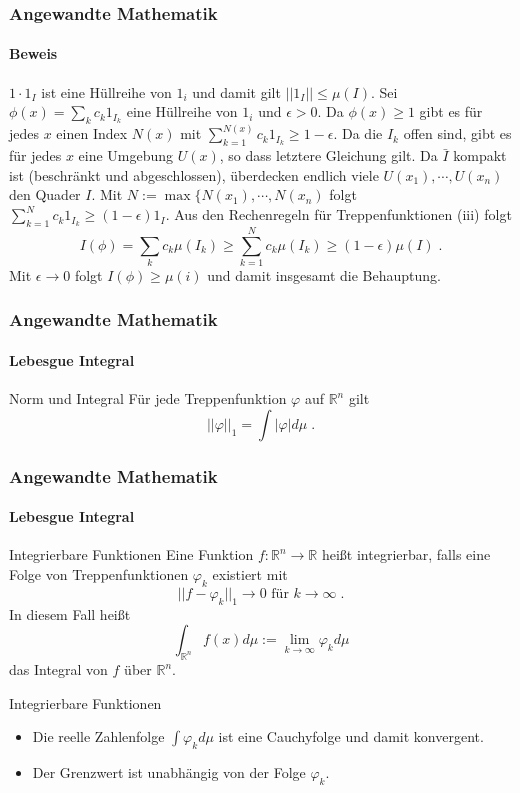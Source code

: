 \documentclass{beamer}
\begin{document}
\begin{frame}
    \frametitle{Angewandte Mathematik}
\framesubtitle{Beweis}
$ 1 \cdot 1_I$ ist eine Hüllreihe von $1_i$ und damit gilt $|| 1_I || \leq \mu(I)$. 
Sei $\phi(x) = \sum_k c_k 1_{I_k} $ eine Hüllreihe von $1_i$ und $\epsilon >0$. Da $\phi(x) \geq 1$ gibt es für jedes $x$ einen Index $N(x)$ mit 
$\sum_{k=1}^{N(x)} c_k 1_{I_k} \geq 1 - \epsilon$. Da die $I_k$ offen sind, gibt es für jedes $x$ eine Umgebung $U(x)$, so dass letztere Gleichung gilt. Da $\bar{I}$ kompakt ist (beschränkt und abgeschlossen), überdecken endlich viele $U(x_1), \cdots , U(x_n)$ den Quader $I$. Mit $N:= \max \{ N(x_1), \cdots , N(x_n)$ folgt $\sum_{k=1}^N c_k 1_{I_k} \geq (1-\epsilon) 1_I$. Aus den Rechenregeln für Treppenfunktionen (iii) folgt
$$ I (\phi) = \sum_k c_k \mu(I_k) \geq \sum_{k=1}^N c_k \mu (I_k) \geq (1 - \epsilon) \mu(I) \;.$$
Mit $\epsilon \to 0$ folgt $I (\phi) \geq \mu(i)$ und damit insgesamt die Behauptung.  
 \end{frame}


\begin{frame}
    \frametitle{Angewandte Mathematik}
\framesubtitle{Lebesgue Integral}
    \begin{block}{Norm und Integral}
Für jede Treppenfunktion $\varphi$ auf $\mathbb{R}^n$ gilt
$$ || \varphi ||_1 = \int | \varphi | d \mu  \; .$$
\end{block}

 \end{frame}




\begin{frame}
    \frametitle{Angewandte Mathematik}
\framesubtitle{Lebesgue Integral}
    \begin{block}{Integrierbare Funktionen}
Eine Funktion $f : \mathbb{R}^n \to \mathbb{R}$ heißt integrierbar, falls eine Folge von Treppenfunktionen  $\varphi_k$ existiert mit
$$ || f -  \varphi_k ||_1 \to 0 \text{ für } k \to \infty \;. $$
In diesem Fall heißt
$$ \int_{\mathbb{R}^n} f(x) d \mu := \lim_{k \to \infty} \varphi_k d \mu$$
das Integral von $f$ über $\mathbb{R}^n$.
\end{block}

    \begin{block}{Integrierbare Funktionen}
\begin{itemize}
\item Die reelle Zahlenfolge $\int \varphi_k d\mu$ ist eine Cauchyfolge und damit konvergent. 
\item Der Grenzwert ist unabhängig von der Folge $\varphi_k$.
\end{itemize}
\end{block}


 \end{frame}
\end{document}
